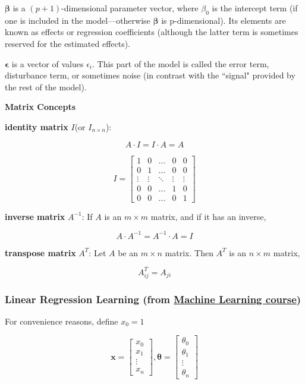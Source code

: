 \documentclass{article}
\begin{document}
\bigskip

\noindent \(\boldsymbol{\beta}\) is a \((p + 1)\)-dimensional parameter vector, where \(\beta_{0}\) is the intercept term (if one is included in the model—otherwise \(\boldsymbol{\beta}\) is p-dimensional). Its elements are known as effects or regression coefficients (although the latter term is sometimes reserved for the estimated effects).

\bigskip

\noindent \(\boldsymbol{\epsilon}\) is a vector of values \(\epsilon_{i}\). This part of the model is called the error term, disturbance term, or sometimes noise (in contrast with the ``signal" provided by the rest of the model).

\bigskip

\noindent \textbf{Matrix Concepts}

\bigskip

\noindent \textbf{identity matrix} \(I\)(or \(I_{n \times n}\)):

\[A \cdot I = I \cdot A = A\]

\[
I = 
\begin{bmatrix}
1 & 0 & \dots & 0 & 0\\
0 & 1 & \dots & 0 & 0\\
\vdots & \vdots & \ddots & \vdots & \vdots\\
0 & 0 & \dots & 1 & 0\\
0 & 0 & \dots & 0 & 1
\end{bmatrix}
\]

\noindent \textbf{inverse matrix} \(A^{-1}\): If \(A\) is an \(m \times m\) matrix, and if it has an inverse,

\[A \cdot A^{-1} = A^{-1} \cdot A = I\]

\noindent \textbf{transpose matrix} \(A^{T}\): Let \(A\) be an \(m \times n\) matrix. Then \(A^T\) is an \(n \times m\) matrix,

\[A^T_{ij} = A_{ji}\]

\subsubsection{Linear Regression Learning (from \href{https://www.coursera.org/learn/machine-learning}{Machine Learning course})}

\noindent For convenience reasons, define \(x_0 = 1\)

\[
\textbf{x} = 
\begin{bmatrix}
x_0\\
x_1\\
\vdots\\
x_n
\end{bmatrix}
,
\boldsymbol{\theta} = 
\begin{bmatrix}
\theta_0\\
\theta_1\\
\vdots\\
\theta_n
\end{bmatrix}
\]
\end{document}
